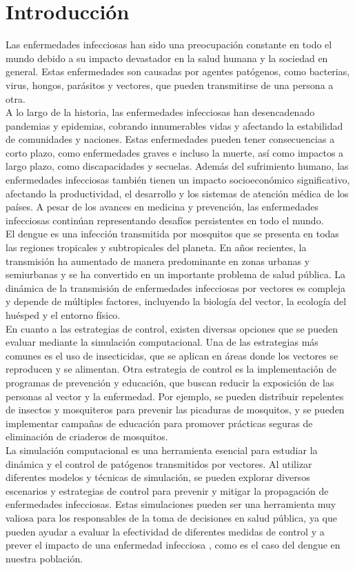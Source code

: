 \chapter*{Introducción}\label{chapter:introduction}
Las enfermedades infecciosas han sido una preocupación constante en todo el mundo debido 
a su impacto devastador en la salud humana y la sociedad en general. Estas enfermedades 
son causadas por agentes patógenos, como bacterias, virus, hongos, parásitos y vectores, que pueden 
transmitirse de una persona a otra. \\
A lo largo de la historia, las enfermedades infecciosas 
han desencadenado pandemias y epidemias, cobrando innumerables vidas y afectando la estabilidad 
de comunidades y naciones. Estas enfermedades pueden tener consecuencias a corto plazo, como 
enfermedades graves e incluso la muerte, así como impactos a largo plazo, como discapacidades y 
secuelas. Además del sufrimiento humano, las enfermedades infecciosas también tienen un impacto 
socioeconómico significativo, afectando la productividad, el desarrollo y los sistemas de atención 
médica de los países. A pesar de los avances en medicina y prevención, las enfermedades infecciosas 
continúan representando desafíos persistentes en todo el mundo. \\
El dengue es una infección transmitida por mosquitos que se presenta en todas
las regiones tropicales y subtropicales del planeta. En años recientes, la transmisión
ha aumentado de manera predominante en zonas urbanas y semiurbanas y se ha convertido 
en un importante problema de salud pública. La dinámica de la transmisión
de enfermedades infecciosas por vectores es compleja y depende de múltiples factores, 
incluyendo la biología del vector, la ecología del huésped y el entorno físico. \\ 
En cuanto a las estrategias de control, existen diversas opciones que se pueden
evaluar mediante la simulación computacional. Una de las estrategias más comunes es
el uso de insecticidas, que se aplican en áreas donde los vectores se reproducen y se
alimentan. Otra estrategia de control es la implementación de programas de prevención y
educación, que buscan reducir la exposición de las personas al vector y la enfermedad.
Por ejemplo, se pueden distribuir repelentes de insectos y mosquiteros para prevenir
las picaduras de mosquitos, y se pueden implementar campañas de educación para
promover prácticas seguras de eliminación de criaderos de mosquitos. \autocite{Gubler1995}\\
La simulación computacional es una herramienta esencial para estudiar la dinámica y 
el control de patógenos transmitidos por vectores. Al utilizar diferentes modelos
y técnicas de simulación, se pueden explorar diversos escenarios y estrategias de
control para prevenir y mitigar la propagación de enfermedades infecciosas. Estas 
simulaciones pueden ser una herramienta muy valiosa para los responsables de la toma
de decisiones en salud pública, ya que pueden ayudar a evaluar la efectividad de 
diferentes medidas de control y a prever el impacto de una enfermedad infecciosa \autocite{Epstein2008}, como
es el caso del dengue en nuestra población. \\

